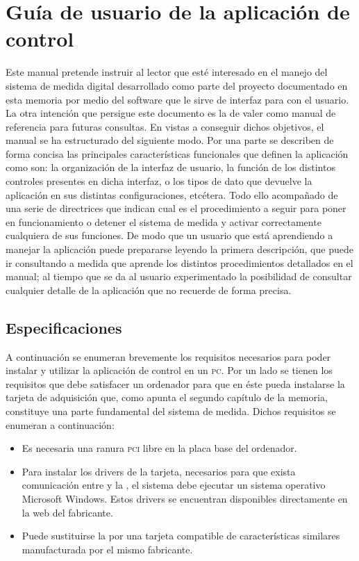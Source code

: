 \chapter{Guía de usuario de la aplicación de control}\label{chap:appendixA}

Este manual pretende instruir al lector que esté interesado en el manejo
del sistema de medida digital desarrollado como parte del proyecto
documentado en esta memoria por medio del software que le sirve de interfaz
para con el usuario. La otra intención que persigue este documento es la de
valer como manual de referencia para futuras consultas. En vistas a
conseguir dichos objetivos, el manual se ha estructurado del siguiente
modo. Por una parte se describen de forma concisa las principales
características funcionales que definen la aplicación como son: la
organización de la interfaz de usuario, la función de los distintos
controles presentes en dicha interfaz, o los tipos de dato que devuelve la
aplicación en sus distintas configuraciones, etcétera. Todo ello acompañado
de una serie de directrices que indican cual es el procedimiento a seguir
para poner en funcionamiento o detener el sistema de medida y activar
correctamente cualquiera de sus funciones. De modo que un usuario que está
aprendiendo a manejar la aplicación puede prepararse leyendo la primera
descripción, que puede ir consultando a medida que aprende los distintos
procedimientos detallados en el manual; al tiempo que se da al usuario
experimentado la posibilidad de consultar cualquier detalle de la
aplicación que no recuerde de forma precisa.


\section{Especificaciones}

A continuación se enumeran brevemente los requisitos necesarios para poder
instalar y utilizar la aplicación de control en un \textsc{pc}. Por un lado
se tienen los requisitos que debe satisfacer un ordenador para que en éste
pueda instalarse la tarjeta de adquisición que, como apunta el segundo
capítulo de la memoria, constituye una parte fundamental del sistema de
medida. Dichos requisitos se enumeran a continuación:

\begin{itemize}
	\item Es necesaria una ranura \textsc{pci} libre en la placa base
		del ordenador.
	\item Para instalar los drivers de la tarjeta, necesarios para que
		exista comunicación entre  y la \kpci{}, el
		sistema debe ejecutar un sistema operativo Microsoft
		Windows. Estos drivers se encuentran disponibles
		directamente en la web del fabricante.
	\item Puede sustituirse la \kpci{} por una tarjeta compatible de
		características similares manufacturada por el mismo
		fabricante.
\end{itemize}

